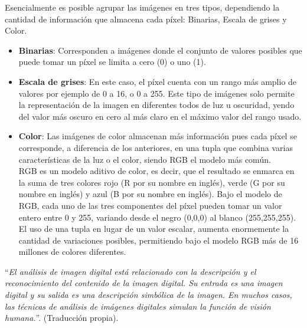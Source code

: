         Esencialmente es posible agrupar las imágenes en tres tipos, dependiendo la cantidad de información que almacena cada píxel: Binarias, Escala de grises y Color.
        
        \begin{itemize}
            \setlength\itemsep{1em}
            \item \textbf{Binarias}: Corresponden a imágenes donde el conjunto de valores posibles que puede tomar un píxel se limita a cero (0) o uno (1).
            
            \item \textbf{Escala de grises}: En este caso, el píxel cuenta con un rango más amplio de valores por ejemplo de 0 a 16, o 0 a 255. Este tipo de imágenes solo permite la representación de la imagen en diferentes todos de luz u oscuridad, yendo del valor más oscuro en cero al más claro en el máximo valor del rango usado.
            
            \item \textbf{Color}: Las imágenes de color almacenan más información pues cada píxel se corresponde, a diferencia de los anteriores, en una tupla que combina varias características de la luz o el color, siendo RGB el modelo más común.\\
            
            RGB es un modelo aditivo de color, es decir, que el resultado se enmarca en la suma de tres colores rojo (R por su nombre en inglés), verde (G por su nombre en inglés) y azul (B por su nombre en inglés). Bajo el modelo de RGB, cada uno de las tres componentes del píxel pueden tomar un valor entero entre 0 y 255, variando desde el negro (0,0,0) al blanco (255,255,255). \\
            
            El uso de una tupla en lugar de un valor escalar, aumenta enormemente la cantidad de variaciones posibles, permitiendo bajo el modelo RGB más de 16 millones de colores diferentes.\\
        \end{itemize}
        
        ``\textit{El análisis de imagen digital está relacionado con la descripción y el reconocimiento del contenido de la imagen digital. Su entrada es una imagen digital y su salida es una descripción simbólica de la imagen. En muchos casos, las técnicas de análisis de imágenes digitales simulan la función de visión humana.}''. \cite[Pág 1]{Pitas2000} (Traducción propia).\\

